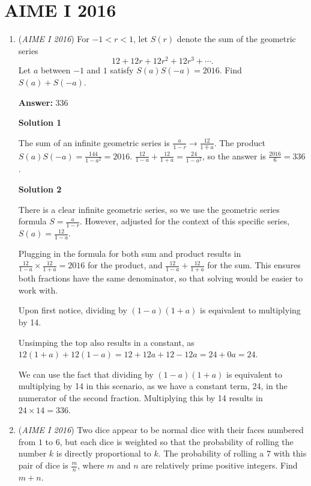 \section{AIME I 2016}
        \begin{enumerate}
        	\item (\textit{AIME I 2016}) For $-1<r<1$, let $S(r)$ denote the sum of the geometric series 
 \[12+12r+12r^2+12r^3+\cdots .\]  Let $a$ between $-1$ and $1$ satisfy $S(a)S(-a)=2016$. Find $S(a)+S(-a)$. 


 
 \textbf{Answer: }336



\textbf{Solution 1}

The sum of an infinite geometric series is $\frac{a}{1-r}\rightarrow \frac{12}{1\mp a}$. The product $S(a)S(-a)=\frac{144}{1-a^2}=2016$. $\frac{12}{1-a}+\frac{12}{1+a}=\frac{24}{1-a^2}$, so the answer is $\frac{2016}{6}=\boxed{336}$.

 



\textbf{Solution 2}

There is a clear infinite geometric series, so we use the geometric series formula $S = \frac{a}{1-r}$. However, adjusted for the context of this specific series, $S(a)=\frac{12}{1-a}$. 

 Plugging in the formula for both sum and product results in$\frac{12}{1-a} \times \frac{12}{1+a} = 2016$ for the product, and $\frac{12}{1-a} + \frac{12}{1+a}$ for the sum. This ensures both fractions have the same denominator, so that solving would be easier to work with.

 Upon first notice, dividing by $(1-a)(1+a)$ is equivalent to multiplying by 14. 

 Unsimping the top also results in a constant, as $12(1+a)+12(1-a)=12 + 12a + 12 - 12a = 24 + 0a = 24$.

 We can use the fact that dividing by $(1-a)(1+a)$ is equivalent to multiplying by 14 in this scenario, as we have a constant term, 24, in the numerator of the second fraction. Multiplying this by 14 results in $24 \times 14 = \boxed{336}$.

 


	\item (\textit{AIME I 2016}) Two dice appear to be normal dice with their faces numbered from $1$ to $6$, but each dice is weighted so that the probability of rolling the number $k$ is directly proportional to $k$. The probability of rolling a $7$ with this pair of dice is $\frac{m}{n}$, where $m$ and $n$ are relatively prime positive integers. Find $m+n$.



\end{enumerate}
